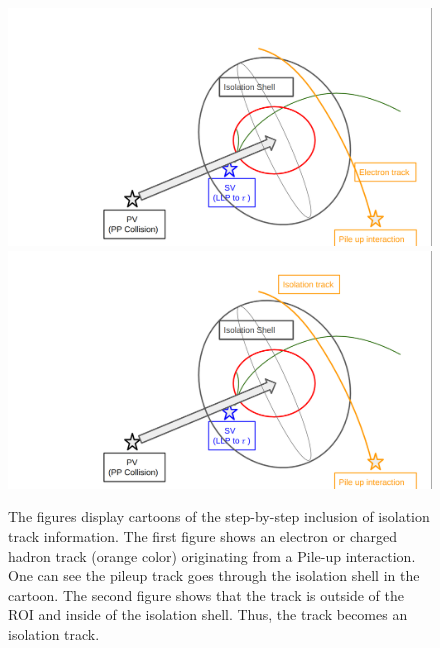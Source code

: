 \begin{figure}[h!]
  \centering
  \includegraphics[width=0.7\linewidth]{figs/ROICT7.png}
  \includegraphics[width=0.7\linewidth]{figs/ROICT8.png}
\caption{
        The figures display cartoons of the step-by-step inclusion of isolation track information.
	The first figure shows an electron or charged hadron track (orange color) originating from a Pile-up interaction.
        One can see the pileup track goes through the isolation shell in the cartoon.
        The second figure shows that the track is outside of the ROI and inside of the isolation shell.
        Thus, the track becomes an isolation track. 
	}
  \label{fig:Clustering3}
\end{figure}


